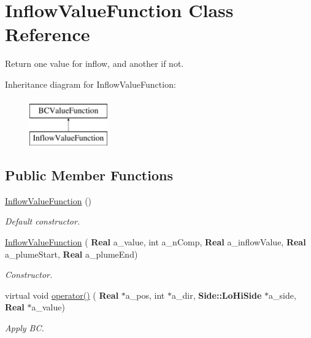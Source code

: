\hypertarget{class_inflow_value_function}{}\section{Inflow\+Value\+Function Class Reference}
\label{class_inflow_value_function}


Return one value for inflow, and another if not.  


Inheritance diagram for Inflow\+Value\+Function\+:\begin{figure}[H]
\begin{center}
\leavevmode
\includegraphics[height=2.000000cm]{class_inflow_value_function}
\end{center}
\end{figure}
\subsection*{Public Member Functions}
\begin{DoxyCompactItemize}
\item 
\mbox{\label{class_inflow_value_function_aea9221992c346bbd12d03c3b7d86e47f}} 
\hyperlink{class_inflow_value_function_aea9221992c346bbd12d03c3b7d86e47f}{Inflow\+Value\+Function} ()
\begin{DoxyCompactList}\small\item\em Default constructor. \end{DoxyCompactList}\item 
\mbox{\label{class_inflow_value_function_a277df57c04250bc62a446a984a878546}} 
\hyperlink{class_inflow_value_function_a277df57c04250bc62a446a984a878546}{Inflow\+Value\+Function} (\textbf{ Real} a\+\_\+value, int a\+\_\+n\+Comp, \textbf{ Real} a\+\_\+inflow\+Value, \textbf{ Real} a\+\_\+plume\+Start, \textbf{ Real} a\+\_\+plume\+End)
\begin{DoxyCompactList}\small\item\em Constructor. \end{DoxyCompactList}\item 
\mbox{\label{class_inflow_value_function_af9941db0cd9f74fc0a5133864cb7d141}} 
virtual void \hyperlink{class_inflow_value_function_af9941db0cd9f74fc0a5133864cb7d141}{operator()} (\textbf{ Real} $\ast$a\+\_\+pos, int $\ast$a\+\_\+dir, \textbf{ Side\+::\+Lo\+Hi\+Side} $\ast$a\+\_\+side, \textbf{ Real} $\ast$a\+\_\+value)
\begin{DoxyCompactList}\small\item\em Apply BC. \end{DoxyCompactList}\end{DoxyCompactItemize}

